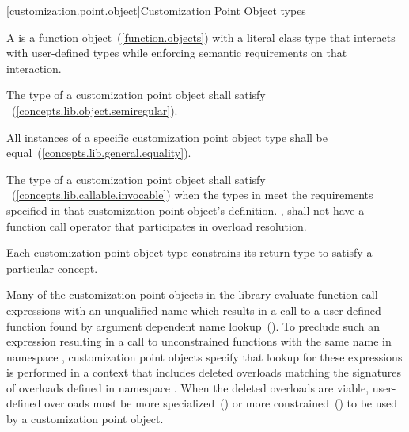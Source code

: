 \setcounter{paragraph}{5}
\begin{addedblock}
[customization.point.object]{Customization Point Object types}

\pnum
A  is a function object~(\ref{function.objects}) with a
literal class type that interacts with user-defined types while
enforcing semantic requirements on that interaction.

\pnum
The type of a customization point object shall satisfy
~(\ref{concepts.lib.object.semiregular}).

\pnum
All instances of a specific customization point object type shall
be equal~(\ref{concepts.lib.general.equality}).

\pnum
The type  of a customization point object shall satisfy
~(\ref{concepts.lib.callable.invocable}) when the types in
 meet the requirements specified in that
customization point object's definition. , 
shall not have a function call operator that participates in
overload resolution.

\pnum
Each customization point object type constrains its return type
to satisfy a particular concept.

\pnum
{}

\pnum
\enternote Many of the customization point objects in the library
evaluate function call expressions with an unqualified name which
results in a call to a user-defined function found by argument
dependent name lookup~(). To preclude
such an expression resulting in a call to unconstrained functions
with the same name in namespace , customization point
objects specify that lookup for these expressions is performed in
a context that includes deleted overloads matching the signatures
of overloads defined in namespace . When the deleted
overloads are viable, user-defined overloads must be more
specialized~() or more
constrained~() to be used by a
customization point object. \exitnote
\end{addedblock}

